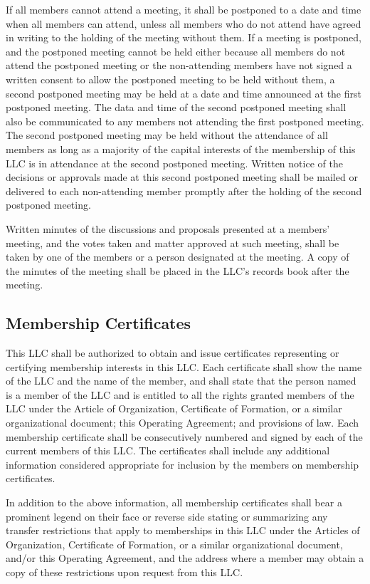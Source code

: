\documentclass{article}
\begin{document}
			\index If all members cannot attend a meeting, it shall be postponed to a date and time when all members can attend, unless all members who do not attend have agreed in writing to the holding of the meeting without them. If a meeting is postponed, and the postponed meeting cannot be held either because all members do not attend the postponed meeting or the non-attending members have not signed a written consent to allow the postponed meeting to be held without them, a second postponed meeting may be held at a date and time announced at the first postponed meeting. The data and time of the second postponed meeting shall also be communicated to any members not attending the first postponed meeting. The second postponed meeting may be held without the attendance of all members as long as a majority of the capital interests of the membership of this LLC is in attendance at the second postponed meeting. Written notice of the decisions or approvals made at this second postponed meeting shall be mailed or delivered to each non-attending member promptly after the holding of the second postponed meeting.

			\index Written minutes of the discussions and proposals presented at a members' meeting, and the votes taken and matter approved at such meeting, shall be taken by one of the members or a person designated at the meeting. A copy of the minutes of the meeting shall be placed in the LLC's records book after the meeting.

			\subsection{Membership Certificates}
			This LLC shall be authorized to obtain and issue certificates representing or certifying membership interests in this LLC. Each certificate shall show the name of the LLC and the name of the member, and shall state that the person named is a member of the LLC and is entitled to all the rights granted members of the LLC under the Article of Organization, Certificate of Formation, or a similar organizational document; this Operating Agreement; and provisions of law. Each membership certificate shall be consecutively numbered and signed by each of the current members of this LLC. The certificates shall include any additional information considered appropriate for inclusion by the members on membership certificates.

			\index In addition to the above information, all membership certificates shall bear a prominent legend on their face or reverse side stating or summarizing any transfer restrictions that apply to memberships in this LLC under the Articles of Organization, Certificate of Formation, or a similar organizational document, and/or this Operating Agreement, and the address where a member may obtain a copy of these restrictions upon request from this LLC.
\end{document}

